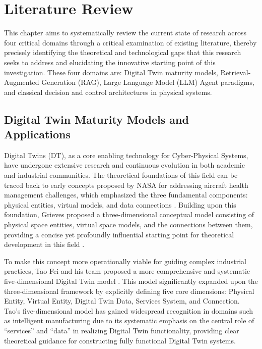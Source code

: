 
\chapter{Literature Review} \label{chp:literature}

This chapter aims to systematically review the current state of research across four critical domains through a critical examination of existing literature, thereby precisely identifying the theoretical and technological gaps that this research seeks to address and elucidating the innovative starting point of this investigation. These four domains are: Digital Twin maturity models, Retrieval-Augmented Generation (RAG), Large Language Model (LLM) Agent paradigms, and classical decision and control architectures in physical systems.

\section{Digital Twin Maturity Models and Applications}

Digital Twins (DT), as a core enabling technology for Cyber-Physical Systems, have undergone extensive research and continuous evolution in both academic and industrial communities. The theoretical foundations of this field can be traced back to early concepts proposed by NASA for addressing aircraft health management challenges, which emphasized the three fundamental components: physical entities, virtual models, and data connections \cite{glaessgen2012digital}. Building upon this foundation, Grieves proposed a three-dimensional conceptual model consisting of physical space entities, virtual space models, and the connections between them, providing a concise yet profoundly influential starting point for theoretical development in this field \cite{grieves2014digital}.

To make this concept more operationally viable for guiding complex industrial practices, Tao Fei and his team proposed a more comprehensive and systematic five-dimensional Digital Twin model \cite{tao2018digital}. This model significantly expanded upon the three-dimensional framework by explicitly defining five core dimensions: Physical Entity, Virtual Entity, Digital Twin Data, Services System, and Connection. Tao's five-dimensional model has gained widespread recognition in domains such as intelligent manufacturing due to its systematic emphasis on the central role of ``services'' and ``data'' in realizing Digital Twin functionality, providing clear theoretical guidance for constructing fully functional Digital Twin systems.

